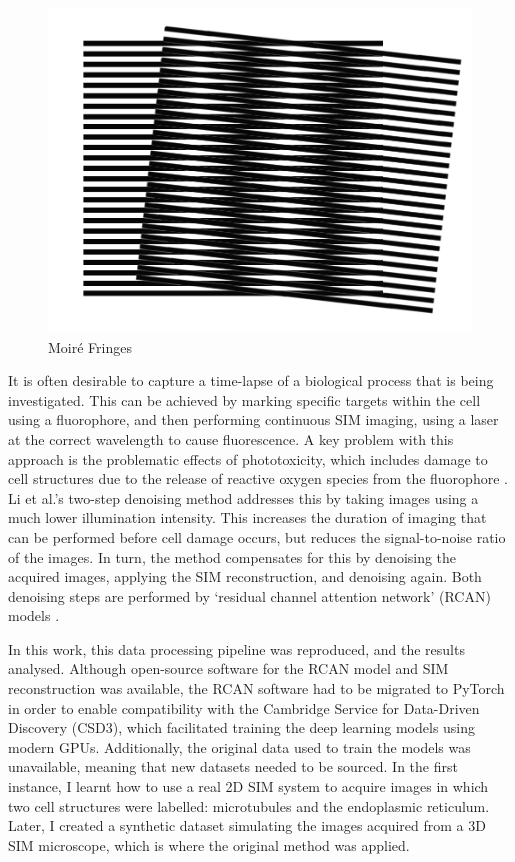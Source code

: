\documentclass[12pt]{article}
\begin{document}
\begin{figure}[tbp]
    \includegraphics[scale=0.3, center]{moire.png}
    \caption{Moir\'{e} Fringes}
    \label{fig:moire}
\end{figure}

It is often desirable to capture a time-lapse of a biological process that is being investigated.
This can be achieved by marking specific targets within the cell using a fluorophore,
and then performing continuous SIM imaging, using a laser at the correct wavelength to cause fluorescence.
A key problem with this approach is the problematic effects of phototoxicity,
which includes damage to cell structures due to the release of reactive oxygen species from the fluorophore \cite{phototoxicity}.
Li et al.'s two-step denoising method \cite{keypaper} addresses this by taking images using a much lower illumination intensity.
This increases the duration of imaging that can be performed before cell damage occurs, but reduces the signal-to-noise ratio of the images.
In turn, the method compensates for this by denoising the acquired images, applying the SIM reconstruction, and denoising again.
Both denoising steps are performed by `residual channel attention network' (RCAN) models \cite{keypaper}.

In this work, this data processing pipeline was reproduced, and the results analysed.
Although open-source software for the RCAN model and SIM reconstruction was available,
the RCAN software had to be migrated to PyTorch in order to enable compatibility with the Cambridge Service for Data-Driven Discovery (CSD3),
which facilitated training the deep learning models using modern GPUs.
Additionally, the original data used to train the models was unavailable,
meaning that new datasets needed to be sourced.
In the first instance, I learnt how to use a real 2D SIM system to acquire images in which two cell structures were labelled: microtubules and the endoplasmic reticulum.
Later, I created a synthetic dataset simulating the images acquired from a 3D SIM microscope,
which is where the original method was applied.
\end{document}
